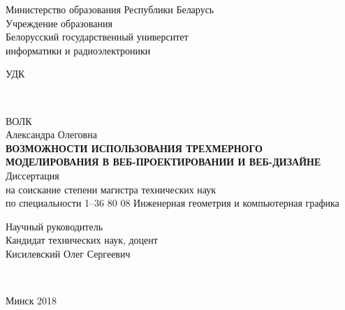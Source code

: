 


  \begin{center}
    Министерство образования Республики Беларусь\\
    Учреждение образования\\
    Белорусский государственный университет \\
    информатики и радиоэлектроники\\[3.2em]

    \begin{flushleft}
      \begin{minipage}{0.4\textwidth}
         УДК
      \end{minipage}\\[3.2em]
    \end{flushleft}

    \MakeUppercase{Волк} \\
    Александра Олеговна \\[5em]


    \MakeUppercase{\textbf{Возможности использования трехмерного моделирования в веб-проектировании и веб-дизайне}}\\[1em]

    Диссертация \\
    на соискание степени магистра технических наук \\
    по специальности 1–36 80 08 Инженерная геометрия и компьютерная графика \\[5em]

    \begin{flushright}
      \begin{minipage}{0.5\textwidth}
        Научный руководитель\\
        Кандидат технических наук, доцент\\
        Кисилевский Олег Сергеевич
      \end{minipage}\\[3.2em]
    \end{flushright}

    \vfill
    {\normalsize Минск 2018}

  \end{center}


